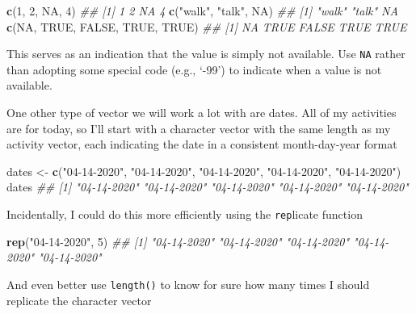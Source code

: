 \documentclass[]{book}
\newenvironment{Shaded}{\begin{snugshade}}{\end{snugshade}}
\newcommand{\CommentTok}[1]{\textcolor[rgb]{0.56,0.35,0.01}{\textit{#1}}}
\newcommand{\DecValTok}[1]{\textcolor[rgb]{0.00,0.00,0.81}{#1}}
\newcommand{\KeywordTok}[1]{\textcolor[rgb]{0.13,0.29,0.53}{\textbf{#1}}}
\newcommand{\NormalTok}[1]{#1}
\newcommand{\OtherTok}[1]{\textcolor[rgb]{0.56,0.35,0.01}{#1}}
\newcommand{\StringTok}[1]{\textcolor[rgb]{0.31,0.60,0.02}{#1}}
\begin{document}
\begin{Shaded}
\begin{Highlighting}[]
\KeywordTok{c}\NormalTok{(}\DecValTok{1}\NormalTok{, }\DecValTok{2}\NormalTok{, }\OtherTok{NA}\NormalTok{, }\DecValTok{4}\NormalTok{)}
\CommentTok{## [1]  1  2 NA  4}
\KeywordTok{c}\NormalTok{(}\StringTok{"walk"}\NormalTok{, }\StringTok{"talk"}\NormalTok{, }\OtherTok{NA}\NormalTok{)}
\CommentTok{## [1] "walk" "talk" NA}
\KeywordTok{c}\NormalTok{(}\OtherTok{NA}\NormalTok{, }\OtherTok{TRUE}\NormalTok{, }\OtherTok{FALSE}\NormalTok{, }\OtherTok{TRUE}\NormalTok{, }\OtherTok{TRUE}\NormalTok{)}
\CommentTok{## [1]    NA  TRUE FALSE  TRUE  TRUE}
\end{Highlighting}
\end{Shaded}

This serves as an indication that the value is simply not available. Use \texttt{NA} rather than adopting some special code (e.g., `-99') to indicate when a value is not available.

One other type of vector we will work a lot with are dates. All of my activities are for today, so I'll start with a character vector with the same length as my activity vector, each indicating the date in a consistent month-day-year format

\begin{Shaded}
\begin{Highlighting}[]
\NormalTok{dates <-}\StringTok{ }\KeywordTok{c}\NormalTok{(}\StringTok{"04-14-2020"}\NormalTok{, }\StringTok{"04-14-2020"}\NormalTok{, }\StringTok{"04-14-2020"}\NormalTok{, }\StringTok{"04-14-2020"}\NormalTok{, }\StringTok{"04-14-2020"}\NormalTok{)}
\NormalTok{dates}
\CommentTok{## [1] "04-14-2020" "04-14-2020" "04-14-2020" "04-14-2020" "04-14-2020"}
\end{Highlighting}
\end{Shaded}

Incidentally, I could do this more efficiently using the \texttt{rep}licate function

\begin{Shaded}
\begin{Highlighting}[]
\KeywordTok{rep}\NormalTok{(}\StringTok{"04-14-2020"}\NormalTok{, }\DecValTok{5}\NormalTok{)}
\CommentTok{## [1] "04-14-2020" "04-14-2020" "04-14-2020" "04-14-2020" "04-14-2020"}
\end{Highlighting}
\end{Shaded}

And even better use \texttt{length()} to know for sure how many times I should replicate the character vector
\end{document}
